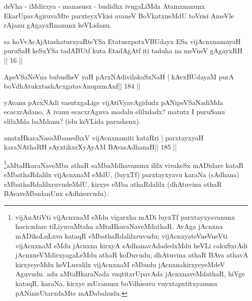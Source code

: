 \begin{artha}
deVha - iMdirxya - manasusx - budidhx ivugaLiMda Atamxnanunx EkarUpavAgiruvaMte parxteyxVkisi avaneV BoVkatxneMdU toVrisi AmeVle rAjanu gAgayxRnanunx keVLidanu.
\end{artha}



\begin{kandikeshl}
sa hoVvAcAjAtashaturxyaRteYSa EtatusxpotxV\s BUdayx 
ESa vijAcnxnamayaH puruSaH keSxYSa tadABUtf
kuta EtadAgAtf iti taduha na meVneV gAgayxRH || 16 ||
\end{kandikeshl}

\begin{shl}
ApeVSaNeVna bubudheV yaH pArxNAdivilakaSxNaH |
kAvxBUdayaM purA boVdhAtukxtashAcx\s\s gatavAnupxmAnf\hfill || 184 ||
\end{shl}

\begin{artha}
yAvanu pArxNAdi vasutxgaLige vijAtiVyavAgidudx pANipeVSaNadiMda  ecacxrAdano, A ivanu ecacxrAguva modalu elilxdadx? matutx I puruSanu elilxMda baMdanu? (idu keVLida parxshenx).
\end{artha}


\begin{shl}
anatxHkaraNasaMbanedhxV vijAcnxnamiti kataRri |
parxtayxyaH karaNAthaRH sAyxtikxrXyAyAM BAvasAdhanaH\hfill || 185 ||
\end{shl}

\begin{artha}
\footnote{vijAnAtiVti vijAcnxnaM eMdu vigarxha mADi luyxTf  parxtayxyavanunx hacicxdare tiLiyuvaMtaha aMtaHkaraNaveMdathaR. AvAga  jAcnxna mADikoLuLxva kataqR eMbathaRdalilxruvudu; vijAcnxyateV\s  \-neVneVti vijAcnxnaM eMdu jAcnxna kirxyA sAdhanavAdadedxMdu heVLi cakuSxrAdi jAcnxneVMdirxyagaLeMdu athaR koDuvudu; dhAtuvina athaR BAva athavA kirxyeyeMdu heVLuvalilx vijAcnxnaM eMbudu jAcnxnakirxyeyeMdeV Aguvudu. adu aMtaHkaraNada vaqtitxrUpavAda jAcnxnaveMdathaR, hiVge kataqR, karaNa, kirxye mUranunx boVdhisuva vuyxtapxtitxyanunx pANinisUtarxdaMte mADabahudu.}aMtaHkaraNaveMba athaR saMbaMdhavanunx ililx vivakeSx mADidare kataR eMbathaRdalilx vijAcnxnaM eMdU, (luyxTf) parxtayxyavu karaNa (sAdhana) eMbathaRdalilxruvudeMdU, kirxye eMba athaRdalilx (dhAtuvina athaR BAvaveMbudanUnx sAdhisuvudu).
\end{artha}

